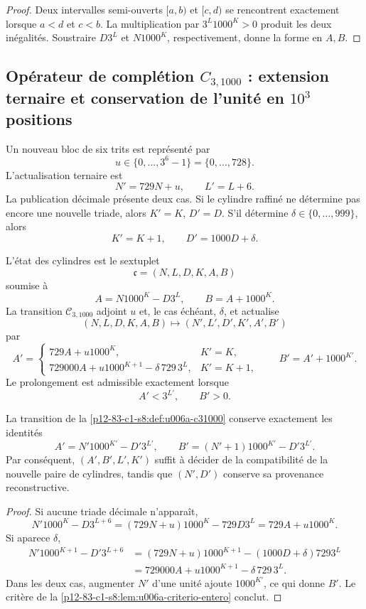 {\begin{proof}
Deux intervalles semi-ouverts \([a,b)\) et \([c,d)\) se rencontrent
exactement lorsque \(a<d\) et \(c<b\). La multiplication par
\(3^L1000^K>0\) produit les deux inégalités. Soustraire \(D3^L\) et
\(N1000^K\), respectivement, donne la forme en \(A,B\).
\end{proof}

\subsection{Opérateur de complétion \(C_{3,1000}\) : extension ternaire et conservation de l’unité en \(10^3\) positions}

Un nouveau bloc de six trits est représenté par
\[
 u\in\{0,\ldots,3^6-1\}=\{0,\ldots,728\}.
\]
L’actualisation ternaire est
\[
 N'=729N+u,
 \qquad L'=L+6.
\]
La publication décimale présente deux cas. Si le cylindre raffiné ne détermine pas
encore une nouvelle triade, alors \(K'=K\), \(D'=D\). S’il détermine
\(\delta\in\{0,\ldots,999\}\), alors
\[
 K'=K+1,
 \qquad D'=1000D+\delta.
\]

\begin{definition}
\label{p12-83-c1-s8:def:u006a-c31000}
L’état des cylindres est le sextuplet
\[
 \mathfrak c=(N,L,D,K,A,B)
\]
soumise à
\[
 A=N1000^K-D3^L,
 \qquad B=A+1000^K.
\]
La transition \(\mathcal C_{3,1000}\) adjoint \(u\) et, le cas échéant,
\(\delta\), et actualise
\[
 (N,L,D,K,A,B)\longmapsto
 (N',L',D',K',A',B')
\]
par
\[
 A'=
 \begin{cases}
  729A+u1000^K,&K'=K,\\[1mm]
  729000A+u1000^{K+1}-\delta\,729\,3^L,&K'=K+1,
 \end{cases}
 \qquad
 B'=A'+1000^{K'}.
\]
Le prolongement est admissible exactement lorsque
\[
 A'<3^{L'},\qquad B'>0.
\]
\end{definition}

\begin{theorem}
\label{p12-83-c1-s8:thm:u006a-exactitud-c31000}
La transition de la \cref{p12-83-c1-s8:def:u006a-c31000} conserve exactement les
identités
\[
 A'=N'1000^{K'}-D'3^{L'},
 \qquad
 B'=(N'+1)1000^{K'}-D'3^{L'}.
\]
Par conséquent, \((A',B',L',K')\) suffit à décider de la compatibilité de la
nouvelle paire de cylindres, tandis que \((N',D')\) conserve sa provenance
reconstructive.
\end{theorem}

\begin{proof}
Si aucune triade décimale n’apparaît,
\[
 N'1000^K-D3^{L+6}
 =(729N+u)1000^K-729D3^L
 =729A+u1000^K.
\]
Si aparece \(\delta\),
\begin{align*}
 N'1000^{K+1}-D'3^{L+6}
 &=(729N+u)1000^{K+1}-(1000D+\delta)7293^L\\
 &=729000A+u1000^{K+1}-\delta\,729\,3^L.
\end{align*}
Dans les deux cas, augmenter \(N'\) d’une unité ajoute \(1000^{K'}\), ce qui
donne \(B'\). Le critère de la \cref{p12-83-c1-s8:lem:u006a-criterio-entero} conclut.
\end{proof}

}
